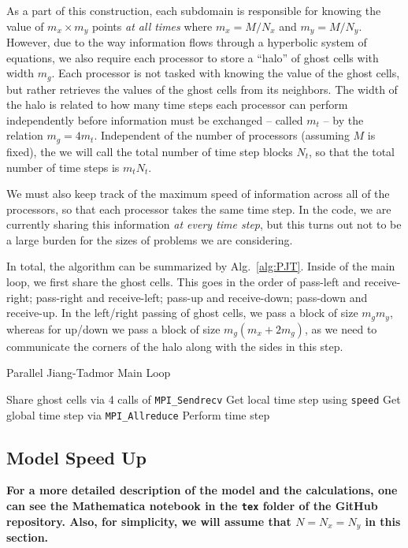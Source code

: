 \documentclass{article}
\begin{document}
As a part of this construction, each subdomain is responsible for knowing the value of $m_x \times m_y$ points \textit{at all times} where $m_x = M/N_x$ and $m_y = M/N_y$. However, due to the way information flows through a hyperbolic system of equations, we also require each processor to store a ``halo'' of ghost cells with width $m_g.$ Each processor is not tasked with knowing the value of the ghost cells, but rather retrieves the values of the ghost cells from its neighbors. The width of the halo is related to how many time steps each processor can perform independently before information must be exchanged -- called $m_t$ -- by the relation $m_g = 4 m_t$. Independent of the number of processors (assuming $M$ is fixed), the we will call the total number of time step blocks $N_t$, so that the total number of time steps is $m_t N_t$. 

We must also keep track of the maximum speed of information across all of the processors, so that each processor takes the same time step. In the code, we are currently sharing this information \textit{at every time step}, but this turns out not to be a large burden for the sizes of problems we are considering. 

In total, the algorithm can be summarized by Alg.~\ref{alg:PJT}. Inside of the main loop, we first share the ghost cells. This goes in the order of pass-left and receive-right; pass-right and receive-left; pass-up and receive-down; pass-down and receive-up. In the left/right passing of ghost cells, we pass a block of size $m_g m_y$, whereas for up/down we pass a block of size $m_g (m_x + 2m_g)$, as we need to communicate the corners of the halo along with the sides in this step. 
\begin{algorithm}
\caption{Parallel Jiang-Tadmor Main Loop}\label{alg:PJT}
\begin{algorithmic}
    \State Share ghost cells via 4 calls of \texttt{MPI\_Sendrecv}
        \State Get local time step using \texttt{speed}
        \State Get global time step via \texttt{MPI\_Allreduce}
        \State Perform time step
    \EndFor
\EndFor
\end{algorithmic}
\end{algorithm}

\subsection{Model Speed Up}
\textbf{For a more detailed description of the model and the calculations, one can see the Mathematica notebook in the \texttt{tex} folder of the GitHub repository. Also, for simplicity, we will assume that $N=N_x=N_y$ in this section.}
\end{document}
